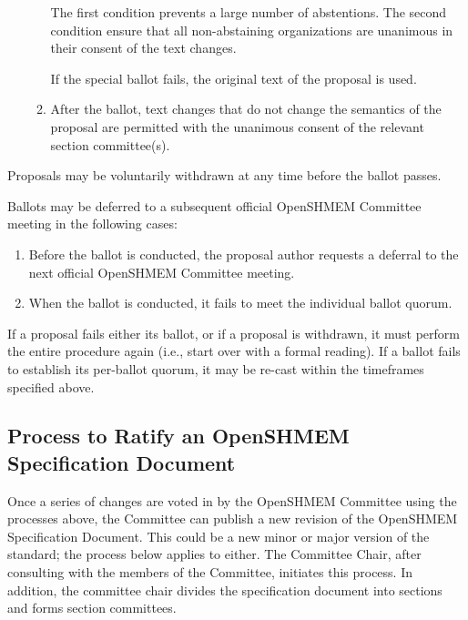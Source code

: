 \begin{enumerate}
\begin{enumerate}
    \begin{rationale}
      The first condition prevents a large number of abstentions.
      The second condition ensure that all non-abstaining
      organizations are unanimous in their consent of the text
      changes.
    \end{rationale}

    If the special ballot fails, the original text of the proposal
    is used.

  \item After the ballot, text changes that do not change the
    semantics of the proposal are permitted with the unanimous consent
    of the relevant section committee(s).
  \end{enumerate}
\end{enumerate}

Proposals may be voluntarily withdrawn at any time before the
ballot passes.

Ballots may be deferred to a subsequent official OpenSHMEM Committee meeting in
the following cases:

\begin{enumerate}
\item Before the ballot is conducted, the proposal author requests a
  deferral to the next official OpenSHMEM Committee meeting.
\item When the ballot is conducted, it fails to meet the individual
  ballot quorum.
\end{enumerate}

If a proposal fails either its ballot, or if a proposal is
withdrawn, it must perform the entire procedure again (i.e., start
over with a formal reading).  If a ballot fails to establish its
per-ballot quorum, it may be re-cast within the timeframes specified
above.


\subsection{Process to Ratify an OpenSHMEM Specification Document}

Once a series of changes are voted in by
the OpenSHMEM Committee using the processes above, the Committee can publish a new
revision of the OpenSHMEM Specification Document.  This could be a new minor or
major version of the standard; the process below applies to either.
The Committee Chair, after consulting with the members of the Committee,
initiates this process.
In addition, the committee chair divides the specification document into
sections and forms section committees.

